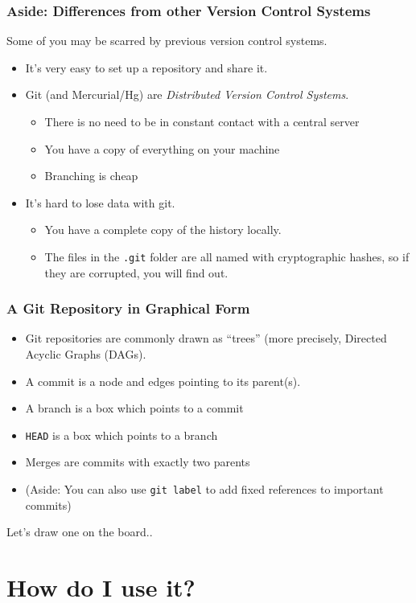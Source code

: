\documentclass{beamer}
\begin{document}
\begin{frame}[fragile]
\frametitle{Aside: Differences from other Version Control Systems}
Some of you may be scarred by previous version control systems.
\begin{itemize}
\item It's very easy to set up a repository and share it.
\item Git (and Mercurial/Hg) are \emph{Distributed Version Control Systems}. 
\begin{itemize}
\item There is no need to be in constant contact with a central server
\item You have a copy of everything on your machine
\item Branching is cheap
\end{itemize}
\item It's hard to lose data with git. 
\begin{itemize}
\item
You have a complete copy of the history locally. 
\item The files in the \texttt{.git} folder are all named with cryptographic hashes, so if they are corrupted, you will find out.
\end{itemize}
\end{itemize}
\end{frame}

\begin{frame}[fragile]
\frametitle{A Git Repository in Graphical Form}
\begin{itemize}
\item Git repositories are commonly drawn as ``trees'' (more precisely, Directed Acyclic Graphs (DAGs).
\item A commit is a node and edges pointing to its parent(s). 
\item A branch is a box which points to a commit
\item \texttt{HEAD} is a box which points to a branch
\item Merges are commits with exactly two parents
\item (Aside: You can also use \lstinline{git label} to add fixed references to important commits)
\end{itemize}
Let's draw one on the board..
\end{frame}

\section{How do I use it?}
\end{document}
